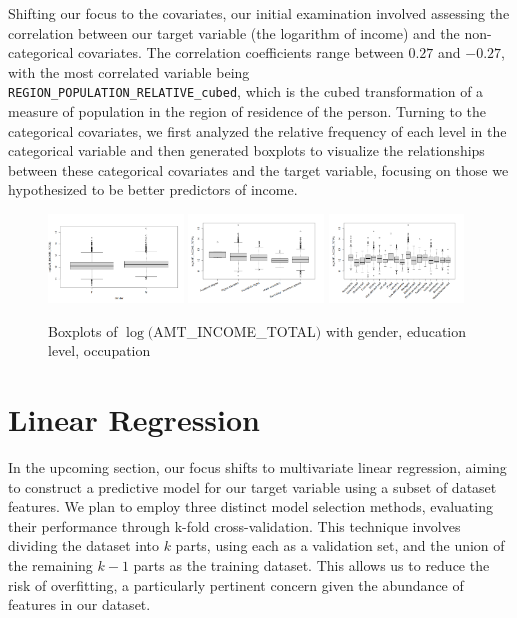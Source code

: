 \documentclass[hidelinks,12pt]{article}
\begin{document}
Shifting our focus to the covariates, our initial examination involved assessing the correlation between our target variable (the logarithm of income) and the non-categorical covariates. The correlation coefficients range between $0.27$ and $-0.27$, with the most correlated variable being \\
\verb|REGION_POPULATION_RELATIVE_cubed|, which is the cubed transformation of a measure of population in the region of residence of the person. Turning to the categorical covariates, we first analyzed the relative frequency of each level in the categorical variable and then generated boxplots to visualize the relationships between these categorical covariates and the target variable, focusing on those we hypothesized to be better predictors of income.
\begin{figure}[h]
  \begin{center}  
  \includegraphics[width=0.32\textwidth]{img/392bcde4-d644-4740-8e7a-72728996638d.png}
  \includegraphics[width=0.32\textwidth]{img/3601fa4a-3df4-4656-831c-429f690699f2.png}
  \includegraphics[width=0.32\textwidth]{img/8d368ccf-52dc-4c06-abaa-e6d8c64b5b73.png}
  \end{center}
\caption{Boxplots of $\log($AMT\_INCOME\_TOTAL$)$ with gender, education level, occupation}
\end{figure}
\section{Linear Regression}
In the upcoming section, our focus shifts to multivariate linear regression, aiming to construct a predictive model for our target variable using a subset of dataset features. We plan to employ three distinct model selection methods, evaluating their performance through k-fold cross-validation. This technique involves dividing the dataset into $k$ parts, using each as a validation set, and the union of the remaining $k-1$ parts as the training dataset. This allows us to reduce the risk of overfitting, a particularly pertinent concern given the abundance of features in our dataset. 
\end{document}
